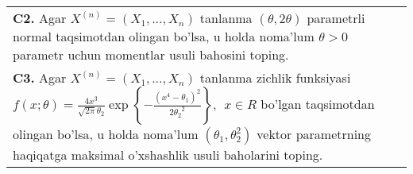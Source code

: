 \documentclass{article}
\begin{document}
\begin{tabular}{m{17cm}}
\\
\textbf{C2.} 
Agar \(X^{(n)} = \left( X_{1},...,X_{n} \right)\) tanlanma \((\theta,2\theta)\) parametrli normal taqsimotdan olingan bo'lsa, u holda noma'lum \(\theta > 0\) parametr uchun momentlar usuli bahosini toping.
\\
\textbf{C3.} 
Agar \(X^{(n)} = \left( X_{1},...,X_{n} \right)\) tanlanma zichlik funksiyasi\(f(x;\theta) = \frac{4x^{3}}{\sqrt{2\pi}\theta_{2}}\exp\left\{ - \frac{\left( x^{4} - \theta_{1} \right)^{2}}{2{\theta_{2}}^{2}} \right\},\ \ x \in R\) bo'lgan taqsimotdan olingan bo'lsa, u holda noma'lum \(\left( \theta_{1},\theta_{2}^{2} \right)\) vektor parametrning haqiqatga maksimal o'xshashlik usuli baholarini toping.
\\

\end{tabular}
\vspace{1cm}
\end{document}
